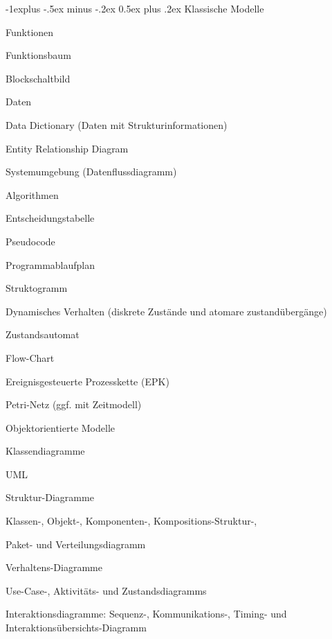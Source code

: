 \documentclass[a4paper]{article}
\makeatletter
\renewcommand{\subsection}{\@startsection{subsection}{2}{0mm}%
                                {-1explus -.5ex minus -.2ex}%
                                {0.5ex plus .2ex}%
                                {\normalfont\normalsize\bfseries}}
\makeatother
\begin{document}
\begin{multicols}{3}
  \subsection{Klassische Modelle}
  \begin{itemize*}
    \item Funktionen
    \begin{itemize*}
      \item Funktionsbaum
      \item Blockschaltbild
    \end{itemize*}
    \item Daten
    \begin{itemize*}
      \item Data Dictionary (Daten mit Strukturinformationen)
      \item Entity Relationship Diagram
    \end{itemize*}
    \item Systemumgebung (Datenflussdiagramm)
    \item Algorithmen
    \begin{itemize*}
      \item Entscheidungstabelle
      \item Pseudocode
      \item Programmablaufplan
      \item Struktogramm
    \end{itemize*}
    \item Dynamisches Verhalten (diskrete Zustände und atomare zustandübergänge)
    \begin{itemize*}
      \item Zustandsautomat
      \item Flow-Chart
      \item Ereignisgesteuerte Prozesskette (EPK)
      \item Petri-Netz (ggf. mit Zeitmodell)
    \end{itemize*}
    \item Objektorientierte Modelle
    \begin{itemize*}
      \item Klassendiagramme
      \item UML
    \end{itemize*}
    \item Struktur-Diagramme
    \begin{itemize*}
      \item Klassen-, Objekt-, Komponenten-, Kompositions-Struktur-,
      \item Paket- und Verteilungsdiagramm
    \end{itemize*}
    \item Verhaltens-Diagramme
    \begin{itemize*}
      \item Use-Case-, Aktivitäts- und Zustandsdiagramms
      \item Interaktionsdiagramme: Sequenz-, Kommunikations-, Timing- und Interaktionsübersichts-Diagramm
    \end{itemize*}
  \end{itemize*}


\end{multicols}
\end{document}

